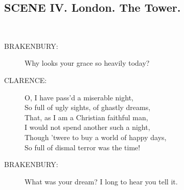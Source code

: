 \documentclass{article}
\begin{document}
\subsection*{SCENE IV.  London. The Tower.}
\\
\begin{description}
\item[BRAKENBURY:] 
\hspace{1pt}Why looks your grace so heavily today?\\
\end{description}
\begin{description}
\item[CLARENCE:] 
\hspace{1pt}O, I have pass'd a miserable night,\\
\hspace{1pt}So full of ugly sights, of ghastly dreams,\\
\hspace{1pt}That, as I am a Christian faithful man,\\
\hspace{1pt}I would not spend another such a night,\\
\hspace{1pt}Though 'twere to buy a world of happy days,\\
\hspace{1pt}So full of dismal terror was the time!\\
\end{description}
\begin{description}
\item[BRAKENBURY:] 
\hspace{1pt}What was your dream? I long to hear you tell it.\\
\end{description}
\end{document}
